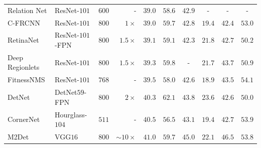 \documentclass[10pt,journal,compsoc]{IEEEtran}
\begin{document}
\begin{table}[ht]
\begin{tabular}{l|lcr|ccc|ccc}
	    Relation Net \cite{HuGZDW18} & ResNet-$101$ & $600$ & - & $39.0$ & $58.6$ & $42.9$ & - & - & - \\  
	    C-FRCNN \cite{ChenHT18} & ResNet-$101$ & $800$ & $1\times$ & $39.0$ & $59.7$ & $42.8$ & $19.4$ & $42.4$ & $53.0$ \\
	    RetinaNet \cite{LinGGHD17} & ResNet-$101$-FPN & $800$ & $1.5\times$ & $39.1$ & $59.1$ & $42.3$ & $21.8$ & $42.7$ & $50.2$ \\
        
        Deep Regionlets \cite{XuLWRBC18} & ResNet-$101$ & $800$ & $1.5\times$  & $39.3$ & $59.8$ &  - & $21.7$ & $43.7$ & $50.9$ \\
		
		FitnessNMS \cite{Tychsen-SmithP18} & ResNet-$101$ & $768$ & - & $39.5$ & $58.0$ & $42.6$ & $18.9$ & $43.5$ & $54.1$ \\
        DetNet \cite{LiPYZDS18} & DetNet$59$-FPN & $800$ & $2\times$ & $40.3$ & $62.1$ & $43.8$ & $23.6$ & $42.6$ & $50.0$ \\		
	    CornerNet \cite{LawD18} & Hourglass-$104$ & $511$ & - & $40.5$ & $56.5$ & $43.1$ & $19.4$ & $42.7$ & $53.9$ \\
	    M2Det \cite{M2DETQ} & VGG$16$ & $800$ & $\sim 10\times$ & $41.0$ & $59.7$ & $45.0$ & $22.1$ & ${46.5}$ & $53.8$ \\
	    

\end{tabular}
\end{table}
\end{document}
